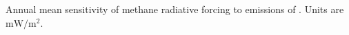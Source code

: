 Annual mean sensitivity of methane radiative forcing to emissions of . Units are $\mathrm{mW/m^2}$.\label{fig:drfdenox}
